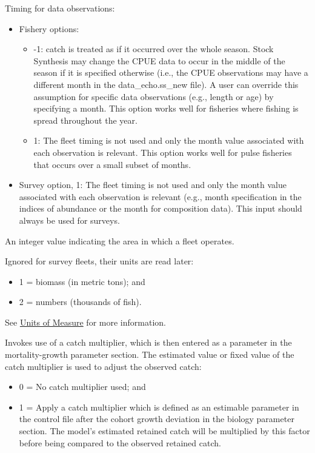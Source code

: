 \hypertarget{ObsTiming}{}
   Timing for data observations:
	  \begin{itemize}
	  	\item Fishery options:
		\begin{itemize}
		    \item -1: catch is treated as if it occurred over the whole season. Stock Synthesis may change the CPUE data to occur in the middle of the season if it is specified otherwise (i.e., the CPUE observations may have a different month in the data\_echo.ss\_new file). A user can override this assumption for specific data observations (e.g., length or age) by specifying a month. This option works well for fisheries where fishing is spread throughout the year.
			\item 1: The fleet timing is not used and only the month value associated with each observation is relevant. This option works well for pulse fisheries that occurs over a small subset of months.
		\end{itemize}
	  	\item Survey option, 1: The fleet timing is not used and only the month value associated with each observation is relevant (e.g., month specification in the indices of abundance or the month for composition data). This input should always be used for surveys.
	  \end{itemize}	  
	  
An integer value indicating the area in which a fleet operates.

  Ignored for survey fleets, their units are read later:
	  \begin{itemize}
	  	\item 1 = biomass (in metric tons); and
	  	\item 2 = numbers (thousands of fish).
	  \end{itemize}   
  See \hyperlink{UnitsOfMeasure}{Units of Measure} for more information.

\hypertarget{CatchMult}{}
Invokes use of a catch multiplier, which is then entered as a parameter in the mortality-growth parameter section.  The estimated value or fixed value of the catch multiplier is used to adjust the observed catch:
	  \begin{itemize}
	  	\item 0 = No catch multiplier used; and
	  	\item 1 = Apply a catch multiplier which is defined as an estimable parameter in the control file after the cohort growth deviation in the biology parameter section. The model's estimated retained catch will be multiplied by this factor before being compared to the observed retained catch.
	  \end{itemize} 
	  
